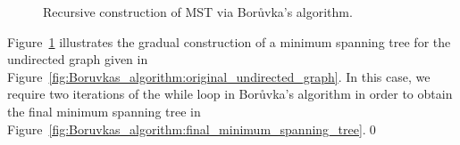\begin{figure}[!htbp]
{}
\qquad
{}
\caption{Recursive construction of MST via Bor\r{u}vka's algorithm.}
\label{fig:trees_forests:Boruvka_algorithm}
\end{figure}

\begin{example}
\rm
Figure~\ref{fig:trees_forests:Boruvka_algorithm} illustrates the
gradual construction of a minimum spanning tree for the undirected
graph given in
Figure~\ref{fig:Boruvkas_algorithm:original_undirected_graph}. In this
case, we require two iterations of the while loop in
Bor\r{u}vka's algorithm in order to
obtain the final minimum spanning tree in
Figure~\ref{fig:Boruvkas_algorithm:final_minimum_spanning_tree}.\qed
\end{example}

